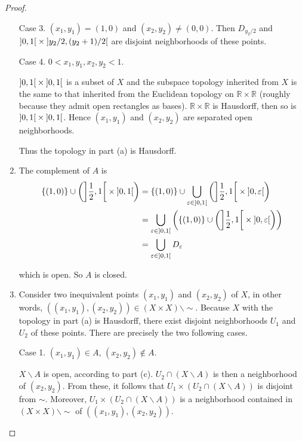 \begin{proof}
\begin{enumerate}[label={(\alph*)}]
              Case 3. $(x_{1}, y_{1}) = (1, 0)$ and $(x_{2}, y_{2}) \ne (0, 0)$. Then $D_{y_{2}/2}$ and $\left]{0, 1}\right[\times\left]{y_{2}/2, (y_{2}+1)/2}\right[$ are disjoint neighborhoods of these points.

              Case 4. $0 < x_{1}, y_{1}, x_{2}, y_{2} < 1$.

              $\left]{0, 1}\right[\times \left]{0, 1}\right[$ is a subset of $X$ and the subspace topology inherited from $X$ is the same to that inherited from the Euclidean topology on $\mathbb{R}\times\mathbb{R}$ (roughly because they admit open rectangles as bases). $\mathbb{R}\times\mathbb{R}$ is Hausdorff, then so is $\left]{0, 1}\right[\times \left]{0, 1}\right[$. Hence $(x_{1}, y_{1})$ and $(x_{2}, y_{2})$ are separated open neighborhoods.

              Thus the topology in part (a) is Hausdorff.
        \item The complement of $A$ is
              \begin{align*}
                  \left\{{(1, 0)}\right\} \cup \left( \left]{\frac{1}{2}, 1}\right[ \times \left]{0, 1}\right[ \right) & = \left\{{(1, 0)}\right\} \cup \bigcup_{\varepsilon\in\left]{0,1}\right[} \left(\left]{\frac{1}{2}, 1}\right[ \times \left]{0, \varepsilon}\right[\right)              \\
                                                                                                            & = \bigcup_{\varepsilon\in\left]{0,1}\right[} \left(\left\{{(1, 0)}\right\} \cup \left(\left]{\frac{1}{2}, 1}\right[ \times \left]{0, \varepsilon}\right[\right)\right) \\
                                                                                                            & = \bigcup_{\varepsilon\in\left]{0,1}\right[} D_{\varepsilon}
              \end{align*}

              which is open. So $A$ is closed.
        \item Consider two inequivalent points $(x_{1}, y_{1})$ and $(x_{2}, y_{2})$ of $X$, in other words, $\left((x_{1}, y_{1}), (x_{2}, y_{2})\right) \in (X\times X)\smallsetminus\sim$. Because $X$ with the topology in part (a) is Hausdorff, there exist disjoint neighborhoods $U_{1}$ and $U_{2}$ of these points. There are precisely the two following cases.

              Case 1. $(x_{1}, y_{1}) \in A$, $(x_{2}, y_{2}) \notin A$.

              $X\smallsetminus A$ is open, according to part (c). $U_{2}\cap (X\smallsetminus A)$ is then a neighborhood of $(x_{2}, y_{2})$. From these, it follows that $U_{1} \times (U_{2}\cap (X\smallsetminus A))$ is disjoint from $\sim$. Moreover, $U_{1} \times (U_{2}\cap (X\smallsetminus A))$ is a neighborhood contained in $(X\times X)\smallsetminus\sim$ of $\left((x_{1}, y_{1}), (x_{2}, y_{2})\right)$.


\end{enumerate}
\end{proof}
